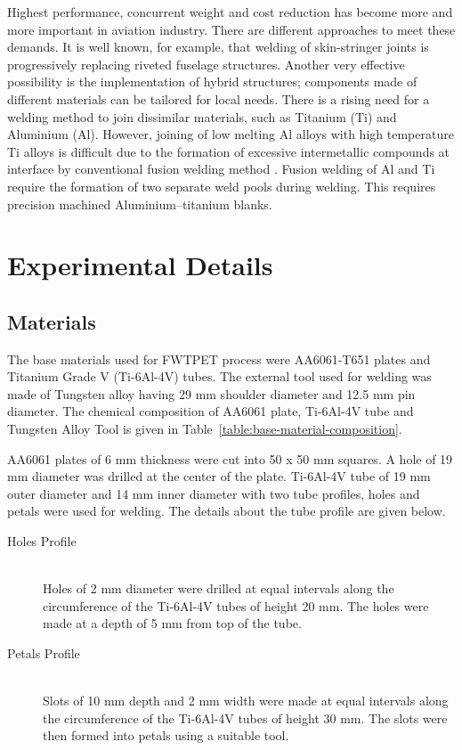 \documentclass[3p]{elsarticle}
\begin{document}
Highest performance, concurrent weight and cost reduction has become more and more important in aviation industry. There are different approaches to meet these demands. It is well known, for example, that welding of skin-stringer joints is progressively replacing riveted fuselage structures. Another very effective possibility is the implementation of hybrid structures; components made of different materials can be tailored for local needs. There is a rising need for a welding method to join dissimilar materials, such as Titanium (Ti) and Aluminium (Al). However, joining of low melting Al alloys with high temperature Ti alloys is difficult due to the formation of excessive intermetallic compounds at interface by conventional fusion welding method \cite{MadhusudhanReddy2009}. Fusion welding of Al and Ti require the formation of two separate weld pools during welding. This requires precision machined Aluminium–titanium blanks.




\begin{table}[!t]

\end{table}


\section{Experimental Details} 
\label{sec:Experimental Details}
\subsection{Materials}
\label{subsec:Materials}
The base materials used for FWTPET process were AA6061-T651 plates and Titanium Grade V (Ti-6Al-4V) tubes. The external tool used for welding was made of Tungsten alloy having 29 mm shoulder diameter and 12.5 mm pin diameter. The chemical composition of AA6061 plate, Ti-6Al-4V tube and Tungsten Alloy Tool is given in Table~\ref{table:base-material-composition}.
\par 
AA6061 plates of 6 mm thickness were cut into 50 x 50 mm squares. A hole of 19 mm diameter was drilled at the center of the plate. Ti-6Al-4V tube of 19 mm outer diameter and 14 mm inner diameter with two tube profiles, holes and petals were used for welding. The details about the tube profile are given below.
\begin{description}
\item [Holes Profile] \hfill \\ 
Holes of 2 mm diameter were drilled at equal intervals along the circumference of the Ti-6Al-4V tubes of height 20 mm. The holes were made at a depth of 5 mm from top of the tube.
\item [Petals Profile] \hfill \\
Slots of 10 mm depth and 2 mm width were made at equal intervals along the circumference of the Ti-6Al-4V tubes of height 30 mm. The slots were then formed into petals using a suitable tool.
\end{description}
\end{document}

